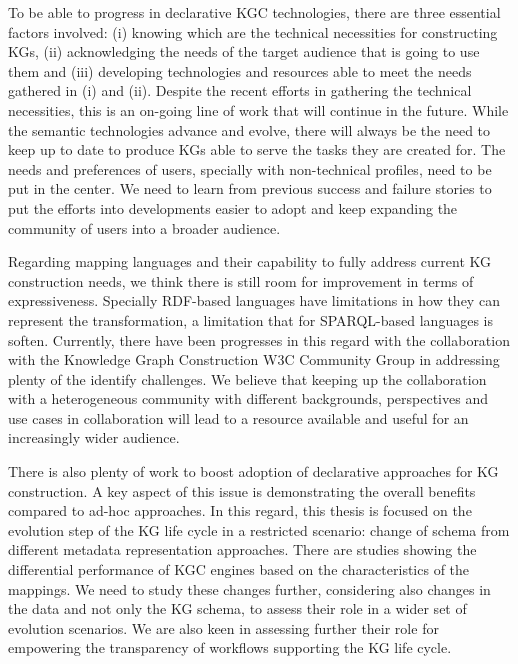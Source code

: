 



To be able to progress in declarative KGC technologies, there are three essential factors involved: (i) knowing which are the technical necessities for constructing KGs, (ii) acknowledging the needs of the target audience that is going to use them and (iii) developing technologies and resources able to meet the needs gathered in (i) and (ii). 
Despite the recent efforts in gathering the technical necessities, this is an on-going line of work that will continue in the future. While the semantic technologies advance and evolve, there will always be the need to keep up to date to produce KGs able to serve the tasks they are created for. The needs and preferences of users, specially with non-technical profiles, need to be put in the center. We need to learn from previous success and failure stories to put the efforts into developments easier to adopt and keep expanding the community of users into a broader audience. %

Regarding mapping languages and their capability to fully address current KG construction needs, we think there is still room for improvement in terms of expressiveness. Specially RDF-based languages have limitations in how they can represent the transformation, a limitation that for SPARQL-based languages is soften. Currently, there have been progresses in this regard with the collaboration with the Knowledge Graph Construction W3C Community Group in addressing plenty of the identify challenges. We believe that keeping up the collaboration with a heterogeneous community with different backgrounds, perspectives and use cases in collaboration will lead to a resource available and useful for an increasingly wider audience.

There is also plenty of work to boost adoption of declarative approaches for KG construction. A key aspect of this issue is demonstrating the overall benefits compared to ad-hoc approaches. In this regard, this thesis is focused on the evolution step of the KG life cycle in a restricted scenario: change of schema from different metadata representation approaches. There are studies showing the differential performance of KGC engines based on the characteristics of the mappings. We need to study these changes further, considering also changes in the data and not only the KG schema, to assess their role in a wider set of evolution scenarios. We are also keen in assessing further their role for empowering the transparency of workflows supporting the KG life cycle.


